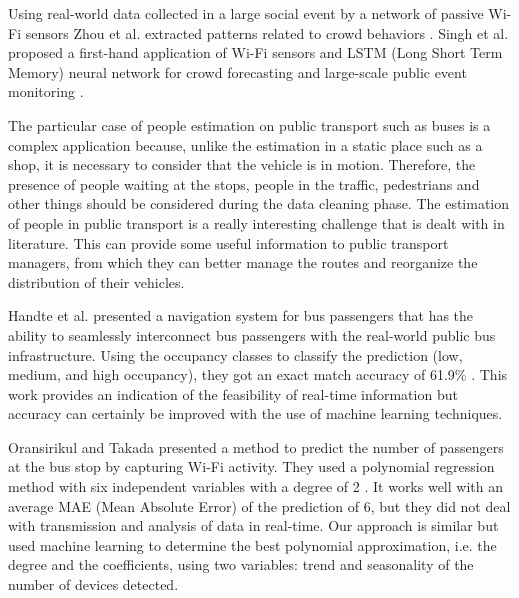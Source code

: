Using real-world data collected in a large social event by a network of passive Wi-Fi sensors Zhou et al. extracted patterns related to crowd behaviors \cite{zhou2020understanding}.
Singh et al. proposed a first-hand application of Wi-Fi sensors and LSTM (Long Short Term Memory) neural network for crowd forecasting and large-scale public event monitoring \cite{singh2020crowd}.

The particular case of people estimation on public transport such as buses is a complex application because, unlike the estimation in a static place such as a shop, it is necessary to consider that the vehicle is in motion. Therefore, the presence of people waiting at the stops, people in the traffic, pedestrians and other things should be considered during the data cleaning phase. The estimation of people in public transport is a really interesting challenge that is dealt with in literature. This can provide some useful information to public transport managers, from which they can better manage the routes and reorganize the distribution of their vehicles.

Handte et al. presented a navigation system for bus passengers that has the ability to seamlessly interconnect bus passengers with the real-world public bus infrastructure. Using the occupancy classes to classify the prediction (low, medium, and high occupancy), they got an exact match accuracy of 61.9\% \cite{handte2016internet}. This work provides an indication of the feasibility of real-time information but accuracy can certainly be improved with the use of machine learning techniques.

Oransirikul and Takada presented a method to predict the number of passengers at the bus stop by capturing Wi-Fi activity. They used a polynomial regression method with six independent variables with a degree of 2 \cite{oransirikul2019practicability}. It works well with an average MAE (Mean Absolute Error) of the prediction of 6, but they did not deal with transmission and analysis of data in real-time.
Our approach is similar but used machine learning to determine the best polynomial approximation, i.e. the degree and the coefficients, using two variables: trend and seasonality of the number of devices detected.
